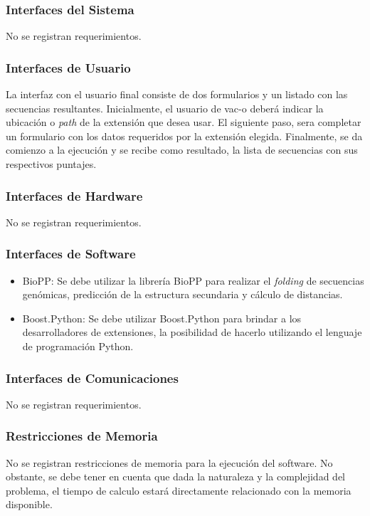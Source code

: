 \documentclass[10pt,a4paper]{article}
\begin{document}
    \subsubsection{Interfaces del Sistema}
    No se registran requerimientos.

    \subsubsection{Interfaces de Usuario}
    La interfaz con el usuario final consiste de dos formularios y un listado con las secuencias resultantes. Inicialmente, el usuario de vac-o deber\'a indicar la ubicaci\'on o \textit{path} de la extensi\'on que desea usar. El siguiente paso, sera completar un formulario con los datos requeridos por la extensi\'on elegida. Finalmente, se da comienzo a la ejecuci\'on y se recibe como resultado, la lista de secuencias con sus respectivos puntajes.

    \subsubsection{Interfaces de Hardware}
    No se registran requerimientos.

    \subsubsection{Interfaces de Software}
    \begin{itemize}
      \item BioPP: Se debe utilizar la librer\'ia BioPP para realizar el \textit{folding} de secuencias gen\'omicas, predicci\'on de la estructura secundaria y c\'alculo de distancias.
      \item Boost.Python: Se debe utilizar Boost.Python para brindar a los desarrolladores de extensiones, la posibilidad de hacerlo utilizando el lenguaje de programaci\'on Python.      
    \end{itemize}

    \subsubsection{Interfaces de Comunicaciones}
    No se registran requerimientos.

    \subsubsection{Restricciones de Memoria}
    No se registran restricciones de memoria para la ejecuci\'on del software. No obstante, se debe tener en cuenta que dada la naturaleza y la complejidad del problema, el tiempo de calculo estar\'a directamente relacionado con la memoria disponible.
\end{document}
